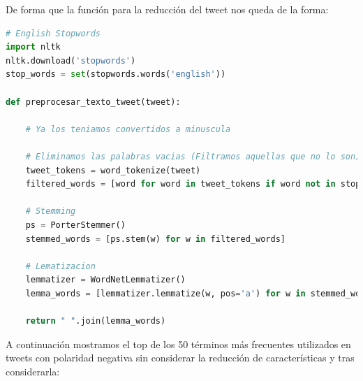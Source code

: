 \documentclass[a4paper,12pt]{report}
\begin{document}
De forma que la función para la reducción del tweet nos queda de la forma: 

\vspace{2mm}
\begin{lstlisting}[language=Python]
# English Stopwords
import nltk
nltk.download('stopwords')
stop_words = set(stopwords.words('english'))

def preprocesar_texto_tweet(tweet):
    
    # Ya los teniamos convertidos a minuscula
    
    # Eliminamos las palabras vacias (Filtramos aquellas que no lo son) 
    tweet_tokens = word_tokenize(tweet)
    filtered_words = [word for word in tweet_tokens if word not in stop_words]
    
    # Stemming
    ps = PorterStemmer()
    stemmed_words = [ps.stem(w) for w in filtered_words]
    
    # Lematizacion
    lemmatizer = WordNetLemmatizer()
    lemma_words = [lemmatizer.lemmatize(w, pos='a') for w in stemmed_words]
    
    return " ".join(lemma_words)
\end{lstlisting}
\vspace{2mm}
A continuación mostramos el top de los 50 términos más frecuentes utilizados en tweets con polaridad negativa sin considerar la reducción de características y tras considerarla:
\end{document}
